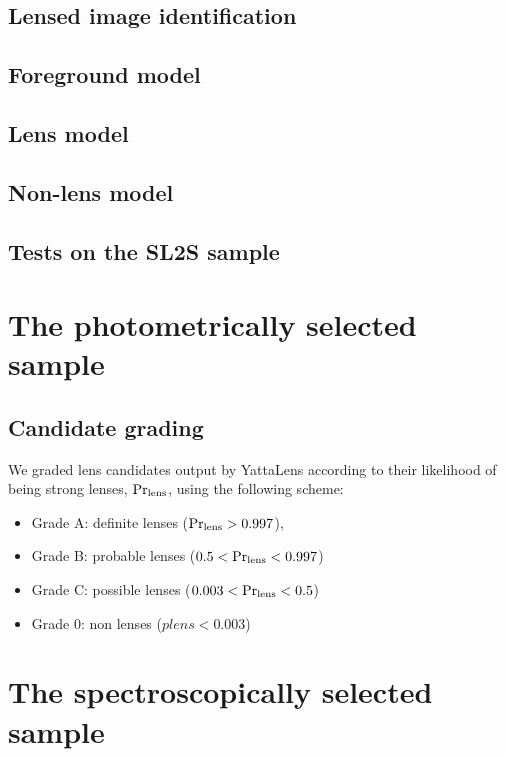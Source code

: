 \documentclass[a4paper,fleqn,usenatbib]{mnras}
\def\pr{{\rm Pr}}
\def\plens{\pr_{\mathrm{lens}}}
\begin{document}
\subsection{Lensed image identification}

\subsection{Foreground model}

\subsection{Lens model}

\subsection{Non-lens model}

\subsection{Tests on the SL2S sample}

\section{The photometrically selected sample}

\subsection{Candidate grading}
We graded lens candidates output by YattaLens according to their likelihood of being strong lenses, $\plens$, using the following scheme:
\begin{itemize}
\item Grade A: definite lenses ($\plens > 0.997$), 
\item Grade B: probable lenses ($0.5 < \plens < 0.997$)
\item Grade C: possible lenses ($0.003 < \plens < 0.5$)
\item Grade 0: non lenses ($plens < 0.003$)
\end{itemize}

\section{The spectroscopically selected sample}
\end{document}
